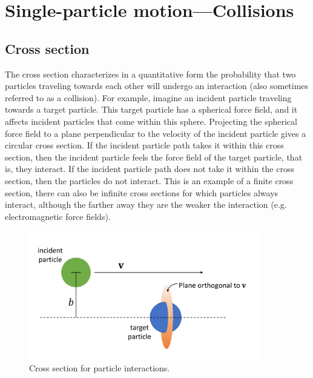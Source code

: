 \documentclass[oneside,a4paper,11pt]{report}
\begin{document}
\chapter{Single-particle motion---Collisions}
\section{Cross section}
The cross section characterizes in a quantitative form the probability that two particles traveling towards each other will undergo an interaction (also sometimes referred to as a collision). For example, imagine an incident particle traveling towards a target particle. This target particle has a spherical force field, and it affects incident particles that come within this sphere. Projecting the spherical force field to a plane perpendicular to the velocity of the incident particle gives a circular cross section. If the incident particle path takes it within this cross section, then the incident particle feels the force field of the target particle, that is, they interact. If the incident particle path does not take it within the cross section, then the particles do not interact. This is an example of a finite cross section, there can also be infinite cross sections for which particles always interact, although the farther away they are the weaker the interaction (e.g. electromagnetic force fields).

\begin{figure}[ht]
\centering
\includegraphics[width=10cm]{../../images/cross_section.pdf}
\caption{Cross section for particle interactions.}
\label{fig:cross_section}
\end{figure}
\end{document}
